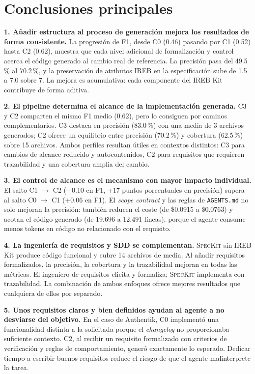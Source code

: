 \section{Conclusiones principales}

\textbf{1. A\~nadir estructura al proceso de generaci\'on mejora los resultados de forma consistente.} La progresi\'on de F1, desde C0 (0.46) pasando por C1 (0.52) hasta C2 (0.62), muestra que cada nivel adicional de formalizaci\'on y control acerca el c\'odigo generado al cambio real de referencia. La precisi\'on pasa del 49.5\,\% al 70.2\,\%, y la preservaci\'on de atributos IREB en la especificaci\'on sube de 1.5 a 7.0 sobre 7. La mejora es acumulativa: cada componente del IREB Kit contribuye de forma aditiva.

\textbf{2. El pipeline determina el alcance de la implementaci\'on generada.} C3 y C2 comparten el mismo F1 medio (0.62), pero lo consiguen por caminos complementarios. C3 destaca en precisi\'on (83.0\,\%) con una media de 3 archivos generados; C2 ofrece un equilibrio entre precisi\'on (70.2\,\%) y cobertura (62.5\,\%) sobre 15 archivos. Ambos perfiles resultan \'utiles en contextos distintos: C3 para cambios de alcance reducido y autocontenidos, C2 para requisitos que requieren trazabilidad y una cobertura amplia del cambio.

\textbf{3. El control de alcance es el mecanismo con mayor impacto individual.} El salto C1 $\rightarrow$ C2 (+0.10 en F1, +17 puntos porcentuales en precisi\'on) supera al salto C0 $\rightarrow$ C1 (+0.06 en F1). El \emph{scope contract} y las reglas de \texttt{AGENTS.md} no solo mejoran la precisi\'on: tambi\'en reducen el coste (de \$0.0915 a \$0.0763) y acotan el c\'odigo generado (de 19.696 a 12.491 l\'ineas), porque el agente consume menos tokens en c\'odigo no relacionado con el requisito.

\textbf{4. La ingenier\'ia de requisitos y SDD se complementan.} \textsc{SpecKit} sin IREB Kit produce c\'odigo funcional y cubre 14 archivos de media. Al a\~nadir requisitos formalizados, la precisi\'on, la cobertura y la trazabilidad mejoran en todas las m\'etricas. El ingeniero de requisitos elicita y formaliza; \textsc{SpecKit} implementa con trazabilidad. La combinaci\'on de ambos enfoques ofrece mejores resultados que cualquiera de ellos por separado.

\textbf{5. Unos requisitos claros y bien definidos ayudan al agente a no desviarse del objetivo.} En el caso de Authentik, C0 implement\'o una funcionalidad distinta a la solicitada porque el \emph{changelog} no proporcionaba suficiente contexto. C2, al recibir un requisito formalizado con criterios de verificaci\'on y reglas de comportamiento, gener\'o exactamente lo esperado. Dedicar tiempo a escribir buenos requisitos reduce el riesgo de que el agente malinterprete la tarea.


